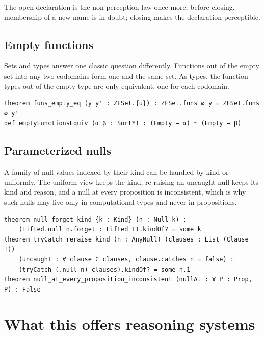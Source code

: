 \documentclass[11pt]{article}
\theoremstyle{plain}
\theoremstyle{definition}
\begin{document}
\noindent The open declaration is the non-perception law once more: before closing, membership
of a new name is in doubt; closing makes the declaration perceptible.

\subsection{Empty functions}

Sets and types answer one classic question differently. Functions out of the empty set into
any two codomains form one and the same set. As types, the function types out of the empty
type are only equivalent, one for each codomain.

\begin{lstlisting}
theorem funs_empty_eq (y y' : ZFSet.{u}) : ZFSet.funs ∅ y = ZFSet.funs ∅ y'
def emptyFunctionsEquiv (α β : Sort*) : (Empty → α) ≃ (Empty → β)
\end{lstlisting}

\subsection{Parameterized nulls}

A family of null values indexed by their kind can be handled by kind or uniformly. The
uniform view keeps the kind, re-raising an uncaught null keeps its kind and reason, and a null
at every proposition is inconsistent, which is why such nulls may live only in computational
types and never in propositions.

\begin{lstlisting}
theorem null_forget_kind {k : Kind} (n : Null k) :
    (Lifted.null n.forget : Lifted T).kindOf? = some k
theorem tryCatch_reraise_kind (n : AnyNull) (clauses : List (Clause T))
    (uncaught : ∀ clause ∈ clauses, clause.catches n = false) :
    (tryCatch (.null n) clauses).kindOf? = some n.1
theorem null_at_every_proposition_inconsistent (nullAt : ∀ P : Prop, P) : False
\end{lstlisting}

\section{What this offers reasoning systems}
\end{document}
